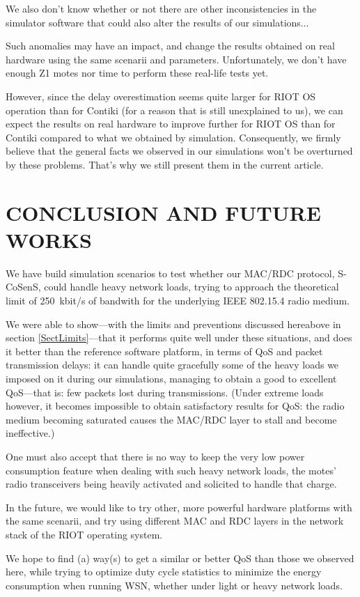 \documentclass[a4paper,twoside]{article}
\begin{document}
We also don't know whether or not there are other inconsistencies in
the simulator software that could also alter the results of our
simulations...

Such anomalies may have an impact, and change the results obtained on real
hardware using the same scenarii and parameters. Unfortunately, we don't
have enough Z1 motes nor time to perform these real-life tests yet.

However, since the delay overestimation seems quite larger for RIOT OS
operation than for Contiki (for a reason that is still unexplained to us),
we can expect the results on real hardware to improve further for RIOT OS
than for Contiki compared to what we obtained by simulation. Consequently,
we firmly believe that the general facts we observed in our simulations
won't be overturned by these problems. That's why we still present
them in the current article.



\section{\uppercase{Conclusion and Future Works}}

We have build simulation scenarios to test whether our MAC/RDC protocol,
S-CoSenS, could handle heavy network loads, trying to approach the
theoretical limit of 250~kbit/s of bandwith for the underlying
IEEE 802.15.4 radio medium.

We were able to show---with the limits and preventions discussed hereabove
in section \ref{SectLimits}---that it performs quite well under these
situations, and does it better than the reference software platform, in terms
of QoS and packet transmission delays: it can handle quite gracefully some of
the heavy loads we imposed on it during our simulations, managing to obtain
a good to excellent QoS---that is: few packets lost during transmissions.
(Under extreme loads however, it becomes impossible to obtain satisfactory
results for QoS: the radio medium becoming saturated causes the MAC/RDC
layer to stall and become ineffective.)

One must also accept that there is no way to keep the very low power
consumption feature when dealing with such heavy network loads, the
motes' radio transceivers being heavily activated and solicited to
handle that charge.

\bigskip

In the future, we would like to try other, more powerful hardware platforms
with the same scenarii, and try using different MAC and RDC layers in
the network stack of the RIOT operating system.

We hope to find (a) way(s) to get a similar or better QoS than those
we observed here, while trying to optimize duty cycle statistics
to minimize the energy consumption when running WSN, whether under
light or heavy network loads.




\vfill

{\small
}
\end{document}
